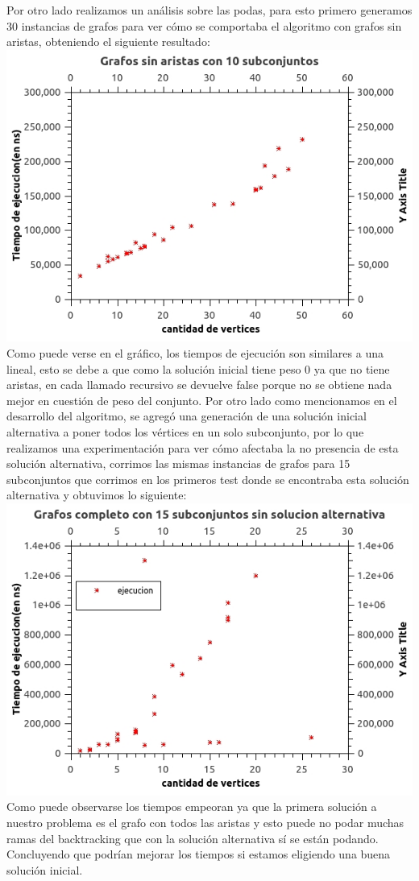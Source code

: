 Por otro lado realizamos un análisis sobre las podas, para esto primero generamos 30 instancias de grafos para ver cómo se comportaba el algoritmo con grafos sin aristas, obteniendo el siguiente resultado:\\
\includegraphics[scale=0.5]{Ej2/sinAristas.jpg}\\
Como puede verse en el gráfico, los tiempos de ejecución son similares a una lineal, esto se debe a que como la solución inicial tiene peso 0 ya que no tiene aristas, en cada llamado recursivo se devuelve false porque no se obtiene nada mejor en cuestión de peso del conjunto.
Por otro lado como mencionamos en el desarrollo del algoritmo, se agregó una generación de una solución inicial alternativa a poner todos los vértices en un solo subconjunto, por lo que realizamos una experimentación para ver cómo afectaba la no presencia de esta solución alternativa, corrimos las mismas instancias de grafos para 15 subconjuntos que corrimos en los primeros test donde se encontraba esta solución alternativa y obtuvimos lo siguiente:\\
\includegraphics[scale=0.5]{Ej2/sinAlternativa.jpg}\\

Como puede observarse los tiempos empeoran ya que la primera solución a nuestro problema es el grafo con todos las aristas y esto puede no podar muchas ramas del backtracking que con la solución alternativa sí se están podando. Concluyendo que podrían mejorar los tiempos si estamos eligiendo una buena solución inicial.